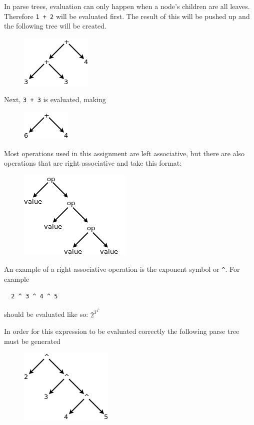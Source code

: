 \documentclass{article}
\newcommand{\code}[1]{\texttt{\textmd{#1}}}
\begin{document}
In parse trees, evaluation can only happen when a node's children are all leaves. Therefore
\code{1 + 2} will be evaluated first. The result of this will be pushed up and the following tree
will be created.
\begin{figure}[H]
  \centering
  \includegraphics{static/left-assoc-plus-2.png}
\end{figure}

Next, \code{3 + 3} is evaluated, making
\begin{figure}[H]
  \centering
  \includegraphics{static/left-assoc-plus-3.png}
\end{figure}

Most operations used in this assignment are left associative, but there are also operations that
are right associative and take this format:
\begin{figure}[H]
  \centering
  \includegraphics{static/right-assoc-gen.png}
\end{figure}

An example of a right associative operation is the exponent symbol or \code{\textasciicircum}.
For example
\begin{lstlisting}
  2 ^ 3 ^ 4 ^ 5
\end{lstlisting}

should be evaluated like so:
\begin{math}
  2 ^ {\displaystyle 3 ^ {\displaystyle 4 ^ {\displaystyle 5 }}}
\end{math}

In order for this expression to be evaluated correctly the following parse tree must be generated
\begin{figure}[H]
  \centering
  \includegraphics{static/right-assoc-pow.png}
\end{figure}
\end{document}
